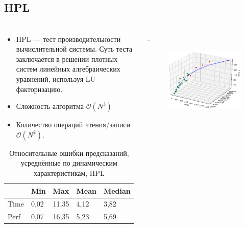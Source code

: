 \documentclass[unicode, t, 11pt]{beamer}%
\newlength{\mylen}
\begin{document}
		\subsection{HPL}
		\begin{frame}
			\footnotesize
			\frametitle{\insertsection}
	 		\framesubtitle{\insertsubsection}
	 		\begin{columns}[T]
	 			\setlength{\mylen}{0.49\textwidth}
	 			\begin{column}{\mylen}
	 				\begin{itemize}[label = \(\bullet\)]
				 		\item HPL — тест производительности вычислительной системы.
				 		Суть теста заключается в решении плотных систем линейных алгебраических уравнений, используя LU факторизацию.
				 		\item Сложность алгоритма \(\mathcal{O}(N^3)\)
				 		\item Количество операций чтения/записи \(\mathcal{O}(N^2)\).
				 	\end{itemize}
				 	\begin{table}
			 			\captionsetup{font=tiny, labelfont=tiny}
			 			\tiny
							\begin{tabularx}{\textwidth}{|X|X|X|X|X|}%
								\hline
								     & Min  & Max   & Mean & Median \\ \hline
								Time & 0,02 & 11,35 & 4,12 & 3,82   \\ \hline
								Perf & 0,07 & 16,35 & 5,23 & 5,69   \\ \hline
							\end{tabularx}
						\caption{Относительные ошибки предсказаний, усреднённые по динамическим характеристикам, HPL}
					\end{table}
	 			\end{column}
	 			\begin{column}{\dimexpr\textwidth-\mylen}
		 			\begin{figure}
						\captionsetup{font=tiny, labelfont=tiny}
						\includegraphics[width=.9\textwidth]{./images/aa}%

\end{figure}
\end{column}
\end{columns}
\end{frame}
\end{document}
